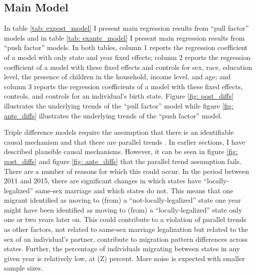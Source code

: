 \documentclass[12pt,letterpaper]{article}
\begin{document}
\clearpage
\subsection{Main Model} %
In table \ref{tab: expost_model} I present main regression results from “pull factor” models and in table \ref{tab: exante_model} I present main regression results from “push factor” models. In both tables, column 1 reports the regression coefficient of a model with only state and year fixed effects; column 2 reports the regression coefficient of a model with these fixed effects and controls for sex, race, education level, the presence of children in the household, income level, and age; and column 3 reports the regression coefficients of a model with these fixed effects, controls, and controls for an individual’s birth state. Figure \ref{fig: post_diffs} illustrates the underlying trends of the “pull factor” model while figure \ref{fig: ante_diffs} illustrates the underlying trends of the “push factor” model. 

Triple difference models require the assumption that there is an identifiable causal mechanism and that there are parallel trends \citep{24, 25}. In earlier sections, I have described plausible causal mechanisms. However, it can be seen in figure \ref{fig: post_diffs} and figure \ref{fig: ante_diffs} that the parallel trend assumption fails. There are a number of reasons for which this could occur. In the period between 2011 and 2015, there are significant changes in which states have “locally-legalized” same-sex marriage and which states do not. This means that one migrant identified as moving to (from) a “not-locally-legalized” state one year might have been identified as moving to (from) a “locally-legalized” state only one or two years later on. This could contribute to a violation of parallel trends as other factors, not related to same-sex marriage legalization but related to the sex of an individual’s partner, contribute to migration pattern differences across states. Further, the percentage of individuals migrating between states in any given year is relatively low, at (Z) percent. More noise is expected with smaller sample sizes. 
\end{document}
